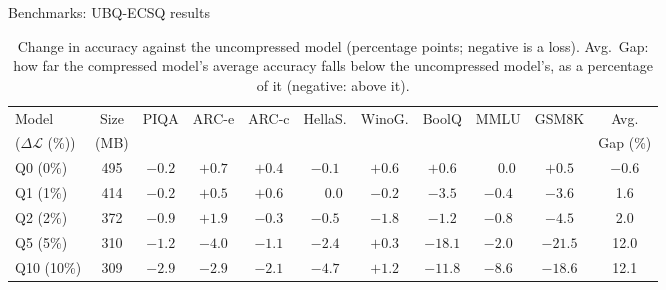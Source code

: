 \documentclass[aspectratio=169,10pt]{beamer}
\newcommand{\dloss}{\Delta\mathcal{L}}
\begin{document}
\begin{frame}{Benchmarks: UBQ-ECSQ results}{}
\begin{table}
\centering
\begin{adjustbox}{width=\linewidth, totalheight=0.64\textheight, keepaspectratio, center}
\centering
\small
\setlength{\tabcolsep}{4pt}
\begin{tabular}{lcccccccccc}
\toprule
Model & Size & PIQA & ARC-e & ARC-c & HellaS. & WinoG. & BoolQ & MMLU & GSM8K & Avg. \\
($\dloss$ (\%)) & (MB) &      &       &       &         &        &       &      &       & Gap (\%)       \\
\midrule
Q0  (0\%)  & 495 & $-0.2$ & $+0.7$ & $+0.4$ & $-0.1$ & $+0.6$ & $+0.6$  & $\phantom{+}0.0$ & $+0.5$ & $-0.6$ \\
Q1  (1\%)  & 414 & $-0.2$ & $+0.5$ & $+0.6$ & $\phantom{+}0.0$ & $-0.2$ & $-3.5$ & $-0.4$ & $-3.6$ & 1.6 \\
Q2  (2\%)  & 372 & $-0.9$ & $+1.9$ & $-0.3$ & $-0.5$ & $-1.8$ & $-1.2$  & $-0.8$ & $-4.5$  & 2.0 \\
Q5  (5\%)  & 310 & $-1.2$ & $-4.0$ & $-1.1$ & $-2.4$ & $+0.3$ & $-18.1$ & $-2.0$ & $-21.5$ & 12.0 \\
Q10 (10\%) & 309 & $-2.9$ & $-2.9$ & $-2.1$ & $-4.7$ & $+1.2$ & $-11.8$ & $-8.6$ & $-18.6$ & 12.1 \\
\bottomrule
\end{tabular}
\end{adjustbox}
\caption{Change in accuracy against the uncompressed model (percentage points; negative is a loss). Avg.\ Gap: how far the compressed model's average accuracy falls below the uncompressed model's, as a percentage of it (negative: above it).}\label{tab:delta}
\end{table}
\end{frame}
\end{document}

